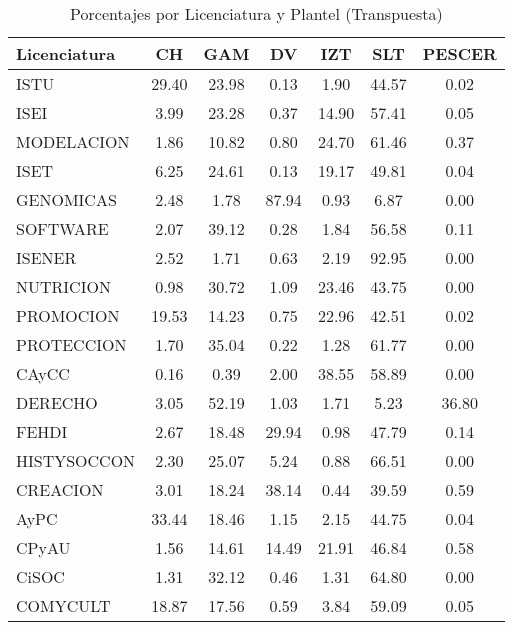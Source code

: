 \documentclass[12pt]{article}
\begin{document}
\begin{table}[ht]
\centering
\caption{Porcentajes por Licenciatura y Plantel (Transpuesta)}
\label{tab:porcentajes_transpuesta}
\begin{tabular}{|l|c|c|c|c|c|c|}
\hline
Licenciatura & CH & GAM & DV & IZT & SLT & PESCER \\ \hline\hline
ISTU & 29.40 & 23.98 & 0.13 & 1.90 & 44.57 & 0.02 \\
ISEI & 3.99 & 23.28 & 0.37 & 14.90 & 57.41 & 0.05 \\
MODELACION & 1.86 & 10.82 & 0.80 & 24.70 & 61.46 & 0.37 \\\hline
ISET & 6.25 & 24.61 & 0.13 & 19.17 & 49.81 & 0.04 \\
GENOMICAS & 2.48 & 1.78 & 87.94 & 0.93 & 6.87 & 0.00 \\
SOFTWARE & 2.07 & 39.12 & 0.28 & 1.84 & 56.58 & 0.11 \\
ISENER & 2.52 & 1.71 & 0.63 & 2.19 & 92.95 & 0.00 \\\hline\hline
NUTRICION & 0.98 & 30.72 & 1.09 & 23.46 & 43.75 & 0.00 \\
PROMOCION & 19.53 & 14.23 & 0.75 & 22.96 & 42.51 & 0.02 \\
PROTECCION & 1.70 & 35.04 & 0.22 & 1.28 & 61.77 & 0.00 \\
CAyCC & 0.16 & 0.39 & 2.00 & 38.55 & 58.89 & 0.00 \\\hline\hline
DERECHO & 3.05 & 52.19 & 1.03 & 1.71 & 5.23 & 36.80 \\
FEHDI & 2.67 & 18.48 & 29.94 & 0.98 & 47.79 & 0.14 \\
HISTYSOCCON & 2.30 & 25.07 & 5.24 & 0.88 & 66.51 & 0.00 \\
CREACION & 3.01 & 18.24 & 38.14 & 0.44 & 39.59 & 0.59 \\\hline
AyPC & 33.44 & 18.46 & 1.15 & 2.15 & 44.75 & 0.04 \\
CPyAU & 1.56 & 14.61 & 14.49 & 21.91 & 46.84 & 0.58 \\
CiSOC & 1.31 & 32.12 & 0.46 & 1.31 & 64.80 & 0.00 \\
COMYCULT & 18.87 & 17.56 & 0.59 & 3.84 & 59.09 & 0.05 \\
\hline
\end{tabular}
\end{table}
\end{document}
